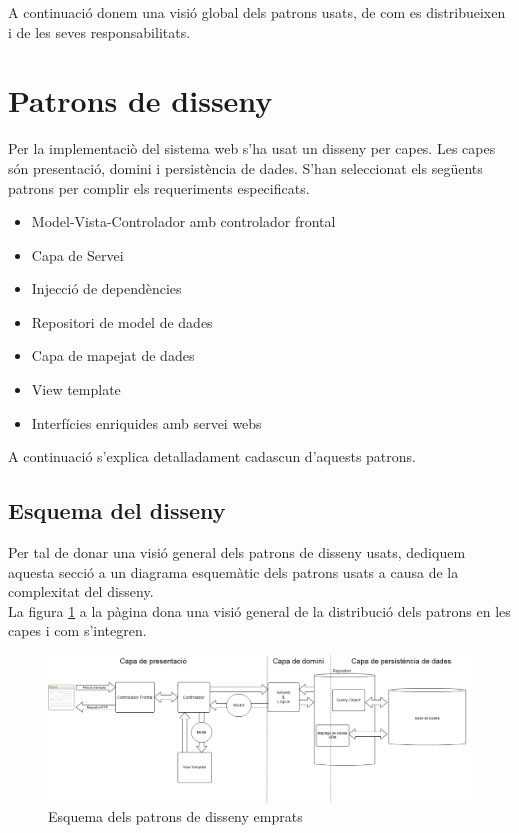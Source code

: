 A continuació donem una visió global dels patrons usats, de com es distribueixen i de les seves responsabilitats.

\section{Patrons de disseny}
Per la implementaci\`{o} del sistema web s'ha usat un disseny per capes. Les capes s\'{o}n presentaci\'{o}, domini i persistència de dades. S'han seleccionat els següents patrons per complir els requeriments especificats.
  \begin{itemize}
  \item Model-Vista-Controlador amb controlador frontal
  \item Capa de Servei
  \item Injecci\'{o} de depend\`{e}ncies
  \item Repositori de model de dades
  \item Capa de mapejat de dades
  \item View template
  \item Interfícies enriquides amb servei webs
  \end{itemize}
A continuació s'explica detalladament cadascun d'aquests patrons.

\subsection{Esquema del disseny}
\label{subsec:dessigndiagram}
Per tal de donar una visió general dels patrons de disseny usats, dediquem aquesta secció a un diagrama esquemàtic dels patrons usats a causa de la complexitat del disseny.\\

La figura \ref{fig:dessignpatters} a la p\`{a}gina \pageref{fig:dessignpatters} dona una visió general de la distribució dels patrons en les capes i com s'integren.\\
\begin{figure}
  \includegraphics[scale=0.4]{img/design/IchnaeaPatterns.png}
  \caption{Esquema dels patrons de disseny emprats}
  \label{fig:dessignpatters}
\end{figure}

